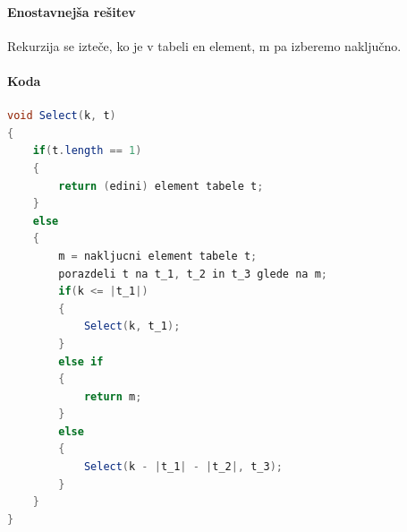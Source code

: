 \documentclass[a4paper,10pt]{article}
\begin{document}
\paragraph{Enostavnej\v sa re\v sitev}
Rekurzija se izte\v ce, ko je v tabeli en element, m pa izberemo naklju\v cno.

\paragraph{Koda}
\begin{flushleft}
\begin{lstlisting}[language=Java]
void Select(k, t)
{
	if(t.length == 1)
	{
		return (edini) element tabele t;
	}
	else
	{
		m = nakljucni element tabele t;
		porazdeli t na t_1, t_2 in t_3 glede na m;
		if(k <= |t_1|)
		{
			Select(k, t_1);
		}
		else if
		{
			return m;
		}
		else
		{
			Select(k - |t_1| - |t_2|, t_3);
		}
	}
}
\end{lstlisting}
\end{flushleft}
\end{document}

